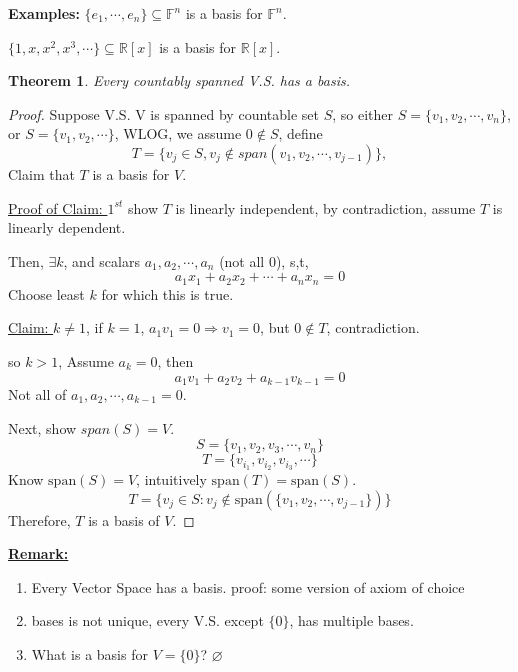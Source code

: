 \documentclass[12pt]{article}
\theoremstyle{plain}
\newtheorem{theorem}{Theorem}[subsection]
\newcommand{\Span}{\mathrm{span}}
\newcommand{\mR}{{\mathbb{R}}}
\newcommand{\mF}{{\mathbb{F}}}
\let\emptyset\varnothing
\begin{document}
	{\color{Brown}
		\textbf{Examples: }
		$\{e_1, \cdots, e_n\}\subseteq \mF^n$ is a basis for $\mF^n$. 

		$\{1,x,x^2,x^3,\cdots\} \subseteq \mR[x]$ is a basis for $\mR[x]$.\\ 
	}

	\begin{theorem}
		Every countably spanned V.S. has a basis.
	\end{theorem}
	\begin{proof}
		Suppose V.S. V is spanned by countable set $S$, so either 
		$ S = \{v_1, v_2, \cdots, v_n\}$, or $S = \{v_1, v_2, \cdots\}$, 
		WLOG, we assume $0\not\in S$, 
		define 
		\[
			T=\{v_j \in S, v_j \not \in span(v_1, v_2, \cdots, v_{j-1})\},
		\]
		Claim that $T$ is a basis for $V$. 

		
		\underline{Proof of Claim: }
		$1^{st}$ show $T$ is linearly independent, 
		by contradiction, assume $T$ is linearly dependent. 
		
		Then, $\exists k$, and scalars $a_1, a_2, \cdots, a_n$ (not all $0$),
		s,t, 
		\[
			a_1x_1+a_2x_2+\cdots+a_nx_n = 0
		\]
		Choose least $k$ for which this is true. 

		\underline{Claim: } $k\neq 1$, if $k=1$, $a_1v_1=0 \Rightarrow v_1=0$, 
		but $0 \not \in T$, contradiction. 
		
		so $k>1$, Assume $a_k=0$, then 
		\[
			a_1v_1+a_2v_2+a_{k-1}v_{k-1} = 0
		\]
		Not all of $a_1,a_2,\cdots,a_{k-1} = 0$. 

		Next, show $span (S) = V$. 
		\[
			S = \{v_1, v_2, v_3, \cdots, v_n\}
		\]
		\[
			T = \{v_{i_1}, v_{i_2}, v_{i_3}, \cdots\} 
		\]
		Know $\Span (S) = V$,  intuitively $\Span(T) = \Span(S)$. 
		\[
			T = \{v_j \in S: v_j \not \in \Span(\{v_1, v_2, \cdots, v_{j-1}\})\}
		\]
		Therefore, $T$ is a basis of $V$. 


	\end{proof}

	{\color{Maroon}
	
	\underline{\textbf{Remark: }} 
	\begin{enumerate}
		\item Every Vector Space has a basis. 
			proof: some version of axiom of choice
		\item bases is not unique, every V.S. except $\{0\}$, has multiple 
			bases. 
		\item What is a basis for $V = \{0\}$? $\emptyset$\\
	\end{enumerate}
	}
	
\end{document}
